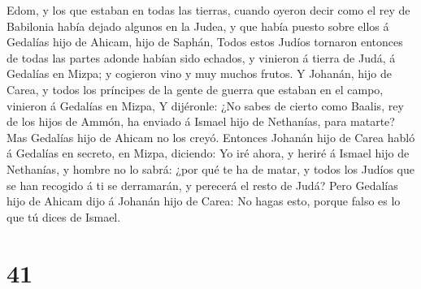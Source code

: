 Edom, y los que estaban en todas las tierras, cuando oyeron decir como
el rey de Babilonia había dejado algunos en la Judea, y que había puesto
sobre ellos á Gedalías hijo de Ahicam, hijo de Saphán, 
Todos estos Judíos tornaron entonces de todas las partes adonde habían
sido echados, y vinieron á tierra de Judá, á Gedalías en Mizpa; y
cogieron vino y muy muchos frutos.  Y Johanán, hijo de
Carea, y todos los príncipes de la gente de guerra que estaban en el
campo, vinieron á Gedalías en Mizpa,  Y dijéronle: ¿No
sabes de cierto como Baalis, rey de los hijos de Ammón, ha enviado á
Ismael hijo de Nethanías, para matarte? Mas Gedalías hijo de Ahicam no
los creyó.  Entonces Johanán hijo de Carea habló á
Gedalías en secreto, en Mizpa, diciendo: Yo iré ahora, y heriré á Ismael
hijo de Nethanías, y hombre no lo sabrá: ¿por qué te ha de matar, y
todos los Judíos que se han recogido á ti se derramarán, y perecerá el
resto de Judá?  Pero Gedalías hijo de Ahicam dijo á
Johanán hijo de Carea: No hagas esto, porque falso es lo que tú dices de
Ismael.

\hypertarget{section-40}{%
\section{41}\label{section-40}}

